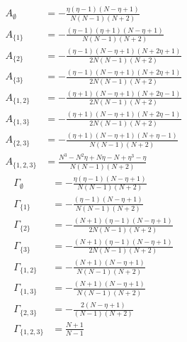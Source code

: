 \documentclass[11pt]{article}
\begin{document}
\begin{align*}
  A_{\emptyset} &= - \frac{\eta \left(\eta - 1\right) \left(N - \eta + 1\right)}{N \left(N - 1\right) \left(N + 2\right)} \\
  A_{\{1\}} &= - \frac{\left(\eta - 1\right) \left(\eta + 1\right) \left(N - \eta + 1\right)}{N \left(N - 1\right) \left(N + 2\right)} \\
  A_{\{2\}} &= - \frac{\left(\eta - 1\right) \left(N - \eta + 1\right) \left(N + 2 \eta + 1\right)}{2 N \left(N - 1\right) \left(N + 2\right)} \\
  A_{\{3\}} &= - \frac{\left(\eta - 1\right) \left(N - \eta + 1\right) \left(N + 2 \eta + 1\right)}{2 N \left(N - 1\right) \left(N + 2\right)} \\
  A_{\{1,2\}} &= - \frac{\left(\eta + 1\right) \left(N - \eta + 1\right) \left(N + 2 \eta - 1\right)}{2 N \left(N - 1\right) \left(N + 2\right)} \\
  A_{\{1,3\}} &= - \frac{\left(\eta + 1\right) \left(N - \eta + 1\right) \left(N + 2 \eta - 1\right)}{2 N \left(N - 1\right) \left(N + 2\right)} \\
  A_{\{2,3\}} &= - \frac{\left(\eta + 1\right) \left(N - \eta + 1\right) \left(N + \eta - 1\right)}{N \left(N - 1\right) \left(N + 2\right)} \\
  A_{\{1,2,3\}} &= \frac{N^{3} - N^{2} \eta + N \eta - N + \eta^{3} - \eta}{N \left(N - 1\right) \left(N + 2\right)} 
\end{align*}
\begin{align*}
  \Gamma_{\emptyset} &= - \frac{\eta \left(\eta - 1\right) \left(N - \eta + 1\right)}{N \left(N - 1\right) \left(N + 2\right)} \\
  \Gamma_{\{1\}} &= - \frac{\left(\eta - 1\right) \left(N - \eta + 1\right)}{N \left(N - 1\right) \left(N + 2\right)} \\
  \Gamma_{\{2\}} &= - \frac{\left(N + 1\right) \left(\eta - 1\right) \left(N - \eta + 1\right)}{2 N \left(N - 1\right) \left(N + 2\right)} \\
  \Gamma_{\{3\}} &= - \frac{\left(N + 1\right) \left(\eta - 1\right) \left(N - \eta + 1\right)}{2 N \left(N - 1\right) \left(N + 2\right)} \\
  \Gamma_{\{1,2\}} &= - \frac{\left(N + 1\right) \left(N - \eta + 1\right)}{N \left(N - 1\right) \left(N + 2\right)} \\
  \Gamma_{\{1,3\}} &= - \frac{\left(N + 1\right) \left(N - \eta + 1\right)}{N \left(N - 1\right) \left(N + 2\right)} \\
  \Gamma_{\{2,3\}} &= - \frac{2 \left(N - \eta + 1\right)}{\left(N - 1\right) \left(N + 2\right)} \\
  \Gamma_{\{1,2,3\}} &= \frac{N + 1}{N - 1} 
\end{align*}
\end{document}
